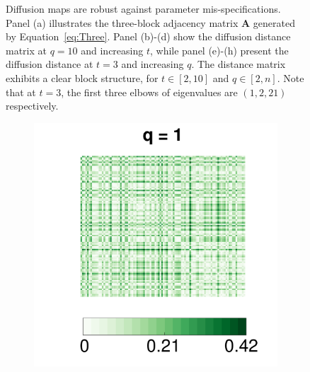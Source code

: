 \documentclass[12pt]{article}
\theoremstyle{definition}
\begin{document}
\begin{figure}[!ht]
\begin{subfigure}[b]{0.23\textwidth}
			\caption{}
			\label{fig:q10}
		\end{subfigure}
		\caption{Diffusion maps are robust against parameter mis-specifications. Panel (a) illustrates the three-block adjacency matrix $\mathbf{A}$ generated by Equation~\ref{eq:Three}. Panel (b)-(d) show the diffusion distance matrix at $q=10$ and increasing $t$, while panel (e)-(h) present the diffusion distance at $t=3$ and increasing $q$. The distance matrix exhibits a clear block structure, for $t \in [2,10]$ and $q \in [2,n]$. Note that at $t=3$, the first three elbows of eigenvalues are $(1,2,21)$ respectively.}
		\label{fig:diffusions}
	\end{figure}
	
	\begin{figure}[!ht]
		\centering
		\begin{subfigure}[b]{0.23\textwidth}
			\includegraphics[width=\textwidth]{../Figure/E1.pdf}
			\caption{}
			\label{fig:e1}
		\end{subfigure}
		\begin{subfigure}[b]{0.23\textwidth}

\end{subfigure}
\end{figure}
\end{document}
